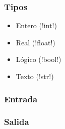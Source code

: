 \documentclass[12pt]{beamer}
\begin{document}
  \begin{frame}
    \frametitle{Tipos}
    \label{tipos}
    \begin{itemize}
      \item Entero (\li!int!)
        
      \item Real (\li!float!)
        
      \item Lógico (\li!bool!)
        
      \item Texto (\li!str!)
        
    \end{itemize}
  \end{frame}

  \begin{frame}
    \frametitle{Entrada}
    \label{ejemplos-entrada}
    
  \end{frame}

  \begin{frame}
    \frametitle{Salida}
    \label{ejemplos-salida}
    
  \end{frame}
\end{document}

